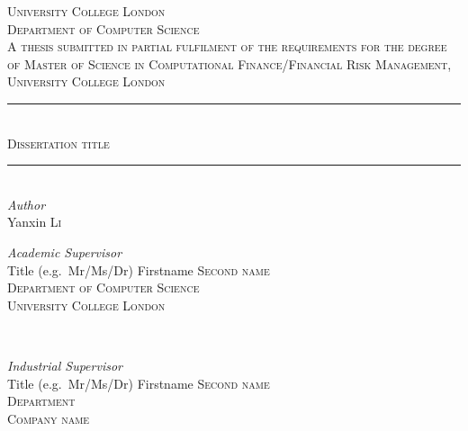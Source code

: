 \documentclass[11pt,a4paper,oneside]{book}
\begin{document}
\pagestyle{plain}
\frontmatter
\begin{titlepage} %
	\newcommand{\HRule}{\rule{\linewidth}{0.5mm}} %
	
	\center %
	\textsc{\LARGE University College London}\\[1.5cm] %
	
	\textsc{\Large Department of Computer Science}\\[0.5cm] %
	
	\textsc{\large A thesis submitted in partial fulfilment of the requirements for the degree of Master of Science in Computational Finance/Financial Risk Management, University College London}\\[0.5cm] %
	\HRule\\[0.4cm]
	\textsc{\huge Dissertation title}\\[0.4cm] %
	\HRule\\[1.5cm]
	{\large\textit{Author}}\\
	Yanxin \textsc{Li} %
	\vfill
	\begin{minipage}{0.48\textwidth}
		\begin{flushleft}
			\large
			\textit{Academic Supervisor}\\
			Title (e.g.~Mr/Ms/Dr) Firstname \textsc{Second name}\\ %
			\textsc{Department of Computer Science}\\
			\textsc{University College London}
		\end{flushleft}
	\end{minipage}
	~%
	\begin{minipage}{0.48\textwidth}
		\begin{flushright}
			\large
			\textit{Industrial Supervisor}\\
			Title (e.g.~Mr/Ms/Dr) Firstname  \textsc{Second name}\\ %
			\textsc{Department}\\%
			\textsc{Company name}%
		\end{flushright}
	\end{minipage}
	\vfill\vfill\vfill %
	

\end{titlepage}
\end{document}
